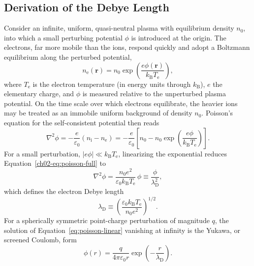 \subsection{Derivation of the Debye Length}

Consider an infinite, uniform, quasi-neutral plasma with equilibrium density $n_{0}$, into which a small perturbing potential $\phi$ is introduced at the origin. The electrons, far more mobile than the ions, respond quickly and adopt a Boltzmann equilibrium along the perturbed potential,
\begin{equation}
n_{\mathrm{e}}(\mathbf{r}) = n_{0}\exp\!\left(\frac{e\phi(\mathbf{r})}{k_{\mathrm{B}} T_{\mathrm{e}}}\right),
\label{ch02-eq:electron-boltzmann}
\end{equation}
where $T_{\mathrm{e}}$ is the electron temperature (in energy units through $k_{\mathrm{B}}$), $e$ the elementary charge, and $\phi$ is measured relative to the unperturbed plasma potential. On the time scale over which electrons equilibrate, the heavier ions may be treated as an immobile uniform background of density $n_{0}$. Poisson's equation for the self-consistent potential then reads
\begin{equation}
\nabla^{2}\phi = -\frac{e}{\varepsilon_{0}}\left(n_{\mathrm{i}} - n_{\mathrm{e}}\right) = -\frac{e}{\varepsilon_{0}}\left[n_{0} - n_{0}\exp\!\left(\frac{e\phi}{k_{\mathrm{B}} T_{\mathrm{e}}}\right)\right].
\label{ch02-eq:poisson-full}
\end{equation}
For a small perturbation, $|e\phi| \ll k_{\mathrm{B}} T_{\mathrm{e}}$, linearizing the exponential reduces Equation~\eqref{ch02-eq:poisson-full} to
\begin{equation}
\nabla^{2}\phi = \frac{n_{0} e^{2}}{\varepsilon_{0} k_{\mathrm{B}} T_{\mathrm{e}}}\,\phi \equiv \frac{\phi}{\lambda_{\mathrm{D}}^{2}},
\label{eq:poisson-linear}
\end{equation}
which defines the electron Debye length
\begin{equation}
\lambda_{\mathrm{D}} \equiv \left(\frac{\varepsilon_{0} k_{\mathrm{B}} T_{\mathrm{e}}}{n_{0} e^{2}}\right)^{1/2}.
\label{ch02-eq:debye-length}
\end{equation}
For a spherically symmetric point-charge perturbation of magnitude $q$, the solution of Equation~\eqref{eq:poisson-linear} vanishing at infinity is the Yukawa, or screened Coulomb, form
\begin{equation}
\phi(r) = \frac{q}{4\pi\varepsilon_{0} r}\exp\!\left(-\frac{r}{\lambda_{\mathrm{D}}}\right).
\label{eq:screened-potential}
\end{equation}
